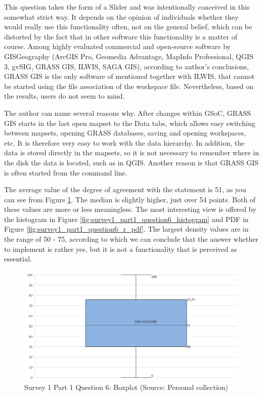 \documentclass[a4paper,10pt,twoside]{article}
\begin{document}
\noindent This question takes the form of a Slider and was
intentionally conceived in this somewhat strict way. It depends on the
opinion of individuals whether they would really use this
functionality often, not on the general belief, which can be distorted
by the fact that in other software this functionality is a matter of
course. Among highly evaluated commercial and open-source software by
GISGeography \cite{gisgeography} (ArcGIS Pro, Geomedia Advantage,
MapInfo Professional, QGIS 3, gvSIG, GRASS GIS, ILWIS, SAGA GIS),
according to author's conclusions, GRASS GIS is the only software of
mentioned together with ILWIS, that cannot be started using the file
association of the workspace file. Nevertheless, based on the results,
users do not seem to mind.

The author can name several reasons why. After changes within GSoC,
GRASS GIS starts in the last open mapset to the Data tabs, which
allows easy switching between mapsets, opening GRASS databases, saving
and opening workspaces, etc. It is therefore very easy to work with
the data hierarchy. In addition, the data is stored directly in the
mapsets, so it is not necessary to remember where in the disk the data
is located, such as in QGIS. Another reason is that GRASS GIS is often
started from the command line.

The average value of the degree of agreement with the statement is 51,
as you can see from Figure
\ref{fig:survey1_part1_question6_boxplot}. The median is slightly
higher, just over 54 points. Both of these values are more or less
meaningless. The most interesting view is offered by the histogram in
Figure \ref{fig:survey1_part1_question6_histogram} and PDF in Figure
\ref{fig:survey1_part1_question6_r_pdf}. The largest density values
are in the range of 50 - 75, according to which we can conclude that
the answer whether to implement is rather yes, but it is not a
functionality that is perceived as essential.

\vspace{0.3cm}
\begin{figure}[hbt!] 
\begin{center}
\includegraphics[width=12.5cm]{../surveys/analyzed_data/survey1_part1_question6_boxplot.png} 
\caption[Survey 1 Part 1 Question 6: Boxplot]{Survey 1 Part 1 Question 6: Boxplot (Source: Personal collection)}
\label{fig:survey1_part1_question6_boxplot}
\end{center}
\end{figure}
\end{document}

